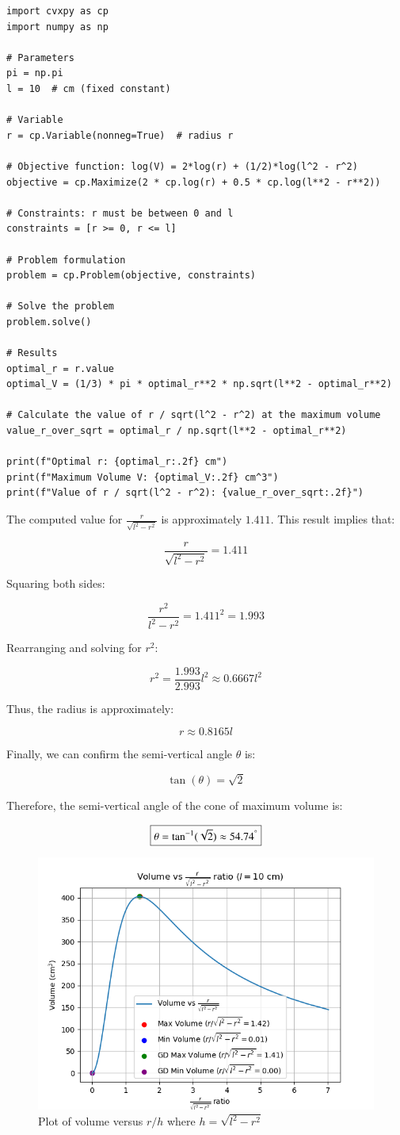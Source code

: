 \documentclass[journal]{IEEEtran}
\begin{document}
\begin{verbatim}
import cvxpy as cp
import numpy as np

# Parameters
pi = np.pi
l = 10  # cm (fixed constant)

# Variable
r = cp.Variable(nonneg=True)  # radius r

# Objective function: log(V) = 2*log(r) + (1/2)*log(l^2 - r^2)
objective = cp.Maximize(2 * cp.log(r) + 0.5 * cp.log(l**2 - r**2))

# Constraints: r must be between 0 and l
constraints = [r >= 0, r <= l]

# Problem formulation
problem = cp.Problem(objective, constraints)

# Solve the problem
problem.solve()

# Results
optimal_r = r.value
optimal_V = (1/3) * pi * optimal_r**2 * np.sqrt(l**2 - optimal_r**2)

# Calculate the value of r / sqrt(l^2 - r^2) at the maximum volume
value_r_over_sqrt = optimal_r / np.sqrt(l**2 - optimal_r**2)

print(f"Optimal r: {optimal_r:.2f} cm")
print(f"Maximum Volume V: {optimal_V:.2f} cm^3")
print(f"Value of r / sqrt(l^2 - r^2): {value_r_over_sqrt:.2f}")
\end{verbatim}

The computed value for \( \frac{r}{\sqrt{l^2 - r^2}} \) is approximately \( 1.411 \). This result implies that:

\[
\frac{r}{\sqrt{l^2 - r^2}} = 1.411
\]

Squaring both sides:

\[
\frac{r^2}{l^2 - r^2} = 1.411^2 = 1.993
\]

Rearranging and solving for \( r^2 \):

\[
r^2 = \frac{1.993}{2.993} l^2 \approx 0.6667 l^2
\]

Thus, the radius is approximately:

\[
r \approx 0.8165 l
\]

Finally, we can confirm the semi-vertical angle \( \theta \) is:

\[
\tan(\theta) = \sqrt{2}
\]

Therefore, the semi-vertical angle of the cone of maximum volume is:

\[
\boxed{\theta = \tan^{-1}(\sqrt{2}) \approx 54.74^\degree}
\]

\begin{figure}[h!]
\centering
\includegraphics[width=\columnwidth]{figs/fig1.png}
\caption{Plot of volume versus $r/h$ where $h=\sqrt{l^2-r^2}$}
\label{stemplot}
\end{figure}
\end{document}
